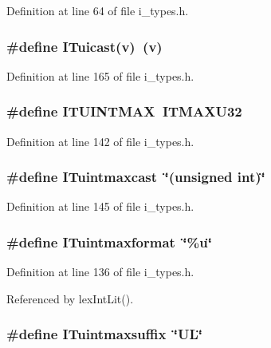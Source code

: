 Definition at line 64 of file i\_\-types.h.
\subsubsection{\setlength{\rightskip}{0pt plus 5cm}\#define ITuicast(v)~(v)}\label{i__types_8h_f8b75f521a7a3b94d51f2910aaf3d7ba}




Definition at line 165 of file i\_\-types.h.
\subsubsection{\setlength{\rightskip}{0pt plus 5cm}\#define ITUINTMAX~ITMAXU32}\label{i__types_8h_c40ac81143e2a78abff9aa244eae90bd}




Definition at line 142 of file i\_\-types.h.
\subsubsection{\setlength{\rightskip}{0pt plus 5cm}\#define ITuintmaxcast~\char`\"{}(unsigned int)\char`\"{}}\label{i__types_8h_54c375be59919e29c657119702fc6c95}




Definition at line 145 of file i\_\-types.h.
\subsubsection{\setlength{\rightskip}{0pt plus 5cm}\#define ITuintmaxformat~\char`\"{}\%u\char`\"{}}\label{i__types_8h_ef8a612d1b527c8d055f04e57ad027dd}




Definition at line 136 of file i\_\-types.h.

Referenced by lex\-Int\-Lit().
\subsubsection{\setlength{\rightskip}{0pt plus 5cm}\#define ITuintmaxsuffix~\char`\"{}UL\char`\"{}}\label{i__types_8h_e3dfcc973f5fa375b0f0a5111c4f123a}




